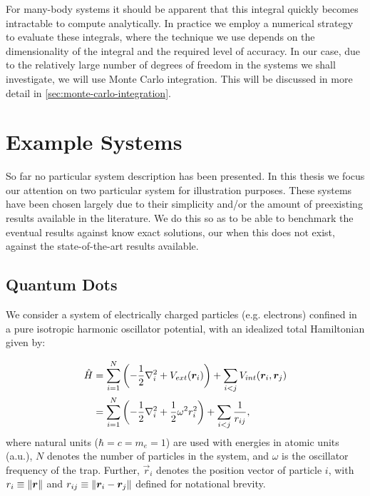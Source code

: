 \documentclass[Thesis.tex]{subfiles}
\begin{document}
For many-body systems it should be apparent that this integral quickly becomes intractable
to compute analytically. In practice we employ a numerical strategy to evaluate these
integrals, where the technique we use depends on the dimensionality of the integral and
the required level of accuracy. In our case, due to the relatively large number
of degrees of freedom in the systems we shall investigate, we will use Monte
Carlo integration. This will be discussed in more detail in \autoref{sec:monte-carlo-integration}.

\section{Example Systems}

So far no particular system description has been presented. In this thesis we focus our
attention on two particular system for illustration purposes. These systems have been
chosen largely due to their simplicity and/or the amount of preexisting results available
in the literature. We do this so as to be able to benchmark the eventual results against
know exact solutions, our when this does not exist, against the state-of-the-art results
available.

\subsection{Quantum Dots}
\label{sec:quantum-dots-theory}

We consider a system of electrically charged particles (e.g. electrons) confined in a pure
isotropic harmonic oscillator potential, with an idealized total Hamiltonian
given by:

\begin{align}
    \begin{split}
        \hat H &= \sum_{i=1}^N\qty(-\frac{1}{2}\laplacian_i + V_{ext}(\vec r_i)) +
        \sum_{i < j} V_{int}(\vec r_i, \vec r_j)\\
        &= \sum_{i=1}^N\qty(-\frac{1}{2}\laplacian_i + \frac{1}{2}\omega^2
        r_i^2) + \sum_{i < j} \frac{1}{r_{ij}},
    \end{split}\label{eq:H-QD-def}
\end{align}
where natural units ($\hbar=c=m_e=1$) are used with energies in
atomic units (a.u.), $N$ denotes the number of particles in the system, and
$\omega$ is the oscillator frequency of the trap. Further, $\vec r_i$
denotes the position vector of particle $i$, with $r_i \equiv \norm{\bm{r}}$ and
$r_{ij}\equiv \norm{\bm{r}_i - \bm{r}_j}$ defined for notational brevity.
\end{document}
